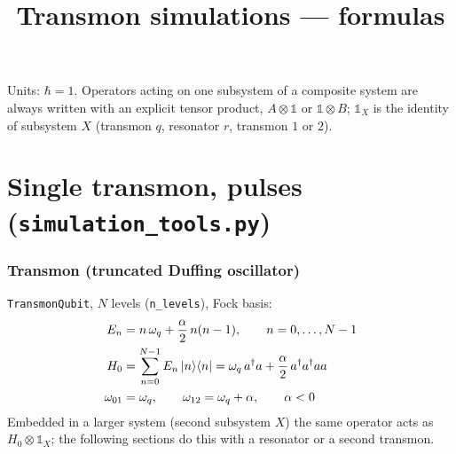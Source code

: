 \documentclass[11pt]{article}
\title{Transmon simulations --- formulas}
\author{}
\date{}
\newcommand{\ad}{a^{\dagger}}
\newcommand{\id}{\mathbb{1}}
\begin{document}
\maketitle
\noindent Units: $\hbar = 1$. Operators acting on one subsystem of a composite system are always
written with an explicit tensor product, $A \otimes \id$ or $\id \otimes B$; $\id_X$ is the identity of
subsystem $X$ (transmon $q$, resonator $r$, transmon $1$ or $2$).

\part*{Single transmon, pulses (\texttt{simulation\_tools.py})}

\section*{Transmon (truncated Duffing oscillator)}
\texttt{TransmonQubit}, $N$ levels (\texttt{n\_levels}), Fock basis:
\begin{align}
  E_n &= n\,\omega_q + \frac{\alpha}{2}\,n(n-1), \qquad n = 0,\dots,N-1 \\
  H_0 &= \sum_{n=0}^{N-1} E_n \ket{n}\!\bra{n}
       = \omega_q\, \ad a + \frac{\alpha}{2}\, \ad \ad a a \\
  \omega_{01} &= \omega_q, \qquad \omega_{12} = \omega_q + \alpha, \qquad \alpha < 0
\end{align}
Embedded in a larger system (second subsystem $X$) the same operator acts as
$H_0 \otimes \id_X$; the following sections do this with a resonator or a second transmon.

\end{document}
